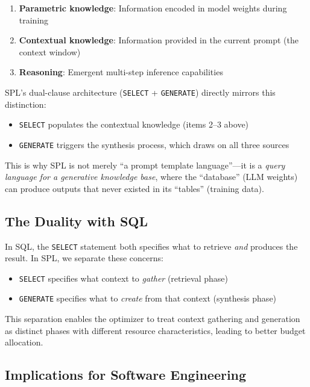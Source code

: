 \documentclass[11pt,a4paper]{article}
\begin{document}
\begin{enumerate}[nosep]
  \item \textbf{Parametric knowledge}: Information encoded in model weights during training
  \item \textbf{Contextual knowledge}: Information provided in the current prompt (the context window)
  \item \textbf{Reasoning}: Emergent multi-step inference capabilities
\end{enumerate}

SPL's dual-clause architecture (\texttt{SELECT} + \texttt{GENERATE}) directly mirrors this distinction:

\begin{itemize}[nosep]
  \item \texttt{SELECT} populates the contextual knowledge (items 2--3 above)
  \item \texttt{GENERATE} triggers the synthesis process, which draws on all three sources
\end{itemize}

This is why SPL is not merely ``a prompt template language''---it is a \emph{query language for a generative knowledge base}, where the ``database'' (LLM weights) can produce outputs that never existed in its ``tables'' (training data).

\subsection{The Duality with SQL}

In SQL, the \texttt{SELECT} statement both specifies what to retrieve \emph{and} produces the result. In SPL, we separate these concerns:

\begin{itemize}[nosep]
  \item \texttt{SELECT} specifies what context to \emph{gather} (retrieval phase)
  \item \texttt{GENERATE} specifies what to \emph{create} from that context (synthesis phase)
\end{itemize}

This separation enables the optimizer to treat context gathering and generation as distinct phases with different resource characteristics, leading to better budget allocation.

\subsection{Implications for Software Engineering}
\end{document}
